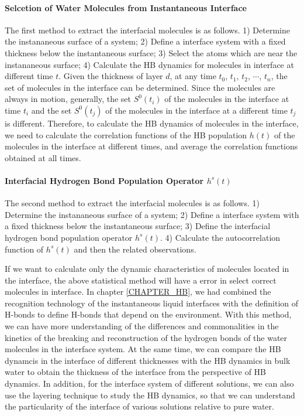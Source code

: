 \paragraph{Selcetion of Water Molecules from Instantaneous Interface}
The first method to extract the interfacial molecules is as follows. 
1) Determine the instananeous surface of a system;
2) Define a interface system with a fixed thickness below the instantaneous surface; 
3) Select the atoms which are near the instananeous surface;
4) Calculate the HB dynamics for molecules in interface at different time $t$.
Given the thickness of layer $d$, at any time $t_0$, $t_1$, $t_2$, $\cdots$, $t_n$, the set of molecules in the interface can be determined. 
Since the molecules are always in motion, generally, the set $S^0(t_i)$ of the molecules in the interface at time $t_i$ 
and the set $S^0(t_j)$ of the molecules in the interface at a different time $t_j$ is different. 
Therefore, to calculate the HB dynamics of molecules in the interface, we need to calculate the correlation functions of 
the HB population $h(t)$ of the molecules in the interface at different times, and average the correlation functions obtained at all times.
 
\paragraph{Interfacial Hydrogen Bond Population Operator $h^s(t)$}
The second method to extract the interfacial molecules is as follows. 
1) Determine the instananeous surface of a system;
2) Define a interface system with a fixed thickness below the instantaneous surface; 
3) Define the interfacial hydrogen bond population operator $h^s(t)$.
4) Calculate the autocorrelation function of $h^s(t)$ and then the related observations. 

If we want to calculate only the dynamic characteristics of molecules located in the interface, 
the above statistical method will have a error in select correct molecules in interface. 
In chapter \ref{CHAPTER_HB}, we had combined the recognition technology of the instantaneous liquid interfaces \cite{Willard2010} 
with the definition of H-bonds \cite{AL96b,Luzar1996} to define H-bonds that depend on the environment. 
With this method, we can have more understanding of the differences and commonalities in the kinetics of the breaking and reconstruction of the hydrogen bonds 
of the water molecules in the interface system. At the same time, we can compare the HB dynamcis in the interface of different thicknesses 
with the HB dynamics in bulk water to obtain the thickness of the interface from the perspective of HB dynamics. 
In addition, for the interface system of different solutions, we can also use the layering technique to study the HB dynamics,
so that we can understand the particularity of the interface of various solutions relative to pure water. 

